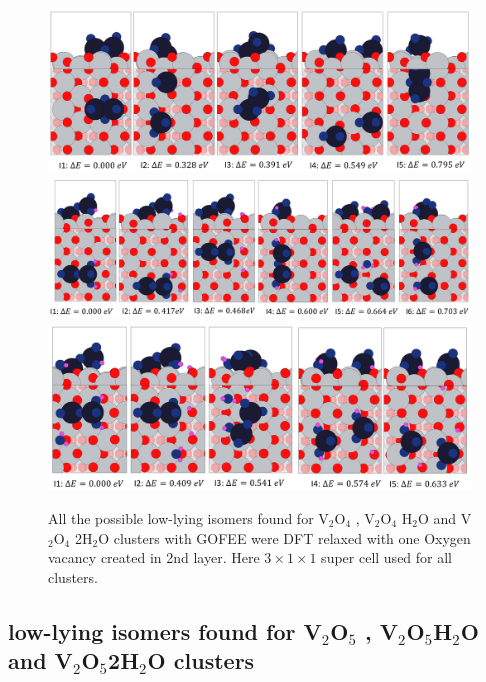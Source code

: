\documentclass[aip,amsmath,amssymb,reprint, jcp]{revtex4-1}
\begin{document}
\begin{figure}
\centering
\includegraphics[width=1.0\textwidth]{V2O4_TiO2_101sur_3by1supercell.png}
\includegraphics[width=1.0\textwidth]{V2O4_H2O_TiO2_101sur_3by1supercell.png}
\includegraphics[width=1.0\textwidth]{V2O4_2H2O_TiO2_101sur_3by1supercell.png}
\caption{All the possible low-lying isomers found for V$_2$O$_4$  , V$_2$O$_4$ H$_2$O and V$_2$O$_4$ 2H$_2$O clusters with GOFEE were DFT relaxed with one Oxygen vacancy created in 2nd layer. Here $3 \times 1 \times 1$ super cell used for all clusters.}
\label{fig:exptobser}
\end{figure}

\subsection{low-lying isomers found for V$_2$O$_5$ , V$_2$O$_5$H$_2$O and V$_2$O$_5$2H$_2$O clusters}
\end{document}
